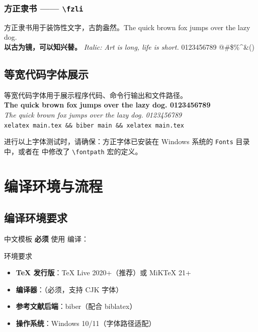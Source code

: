 \subsubsection{方正隶书 —— \texttt{\textbackslash fzli}}
{\fzli
\noindent 方正隶书用于装饰性文字，古韵盎然。The quick brown fox jumps over the lazy dog.\\
\textbf{以古为镜，可以知兴替。} \textit{Italic: Art is long, life is short.} 0123456789 @\#\$\%\textasciicircum\&\*()
}

\subsection{等宽代码字体展示}

{\ttfamily
\noindent 等宽代码字体用于展示程序代码、命令行输出和文件路径。\\
\textbf{The quick brown fox jumps over the lazy dog. 0123456789}\\
\textit{The quick brown fox jumps over the lazy dog. 0123456789}\\
\texttt{xelatex main.tex \&\& biber main \&\& xelatex main.tex}
}

进行以上字体测试时，请确保：方正字体已安装在 Windows 系统的
\texttt{Fonts} 目录中，或者在  中修改了
\lstinline|\fontpath| 宏的定义。


\section{编译环境与流程}


\subsection{编译环境要求}

 中文模板 \textbf{必须} 使用 \XeLaTeX{} 编译：

\begin{sidebox}{环境要求}
\begin{itemize}
    \item \textbf{TeX 发行版}：TeX Live 2020+（推荐）或 MiKTeX 21+
    \item \textbf{编译器}：\XeLaTeX{}（必须，支持 CJK 字体）
    \item \textbf{参考文献后端}：biber（配合 biblatex）
    \item \textbf{操作系统}：Windows 10/11（字体路径适配）
\end{itemize}
\end{sidebox}

